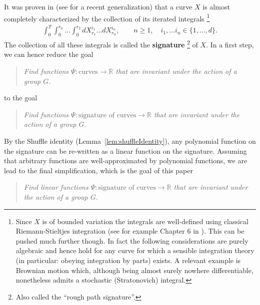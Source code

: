 \documentclass{scrartcl}
\theoremstyle{plain}
\theoremstyle{definition}
\newcommand{\R}{\mathbb{R}}
\newcommand{\1}[1]{1_{\{#1\}}}
\newcommand{\ds}{d} %
\begin{document}
It was proven in \cite{bib:Che1957} (see \cite{bib:HL2010} for a recent generalization)
that a curve $X$ is almost completely characterized by the collection of its iterated integrals%
\footnote
{
  Since $X$ is of bounded variation
  the integrals are well-defined using classical Riemann-Stieltjes integration (see for example Chapter 6 in \cite{bib:Rud1964}).
  This can be pushed much further though.
  In fact the following considerations are purely algebraic
  and hence hold for any curve for which a sensible integration theory (in particular: obeying integration by parts) exists.
  A relevant example is Brownian motion which, although being almost surely
  nowhere differentiable, nonetheless admits a stochastic (Stratonovich) integral.
}
\begin{align*}
  \int_0^T \int_0^{r_n} \dots \int_0^{r_2} dX^{i_1}_{r_1} \dots dX^{i_n}_{r_n}, \qquad n \ge 1,\quad i_1, \dots i_n \in \{1,\dots,\ds\}.
\end{align*}
The collection of all these integrals is called the \textbf{signature}%
\footnote{ Also called the ``rough path signature''.}
of $X$.
In a first step,
we can hence reduce the goal
\begin{quote}
  \textit{Find functions $\Psi: \text{curves} \to \R$ that are invariant under the action of a group $G$.}
\end{quote}
to the goal
\begin{quote}
  \textit{Find functions $\Psi: \text{signature of curves} \to \R$ that are invariant under the action of a group $G$.}
\end{quote}
%
By the Shuffle identity (Lemma~\ref{lem:shuffleIdentity}),
any polynomial function on the signature can be re-written as a linear function on the signature.
Assuming that arbitrary functions are well-approximated by polynomial functions,
we are lead to the final simplification, which is the goal of this paper
\begin{quote}
  \textit{Find \emph{linear} functions $\Psi: \text{signature of curves} \to \R$ that are invariant under the action of a group $G$.}
\end{quote}
\end{document}
